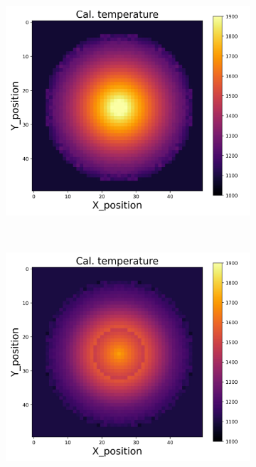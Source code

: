 {\begin{figure}[p]
\begin{minipage}{\textwidth}
\begin{subfigure}{0.325\textwidth}
        \end{subfigure}
        \begin{subfigure}{0.325\textwidth}
            \centering
            \includegraphics[width=\textwidth]{figures/raw_data/24/lin_square/T_cal.jpg}
        \end{subfigure}
    \end{minipage}\\
    \begin{minipage}{\textwidth}
        \centering
        \begin{subfigure}{0.325\textwidth}
            \centering
            \includegraphics[width=\textwidth]{figures/raw_data/25/lin_square/T_cal.jpg}

\end{subfigure}
\end{minipage}
\end{figure}}
